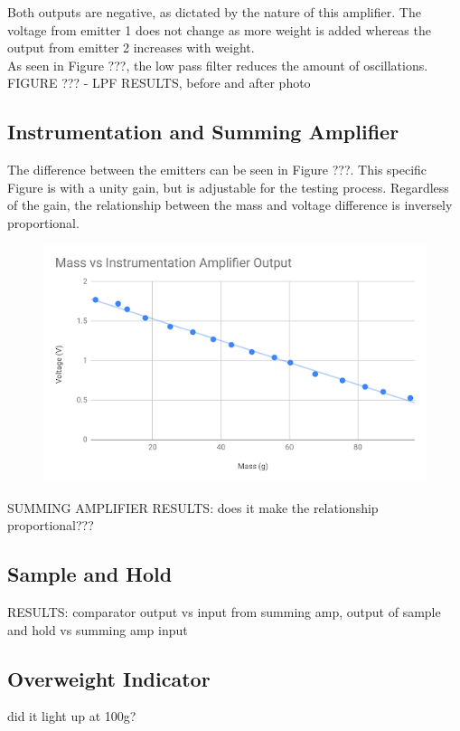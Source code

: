 \documentclass[12pt]{article}
\begin{document}
		Both outputs are negative, as dictated by the nature of this amplifier. The voltage from emitter 1 does not change as more weight is added whereas the output from emitter 2 increases with weight.\\
		
		As seen in Figure ???, the low pass filter reduces the amount of oscillations.\\
		
		FIGURE ??? - LPF RESULTS, before and after photo 
		
		\subsection{Instrumentation and Summing Amplifier}
		The difference between the emitters can be seen in Figure ???. This specific Figure is with a unity gain, but is adjustable for the testing process. Regardless of the gain, the relationship between the mass and voltage difference is inversely proportional.\\
		\begin{figure}[h!]
			\centering
			\includegraphics[width=\columnwidth]{difference_results}
			\caption{}
		\end{figure}
		
		SUMMING AMPLIFIER RESULTS: does it make the relationship proportional???
		\subsection{Sample and Hold}
		
		RESULTS: comparator output vs input from summing amp, output of sample and hold vs summing amp input
		
		\subsection{Overweight Indicator}
		did it light up at 100g?
		
\end{document}
